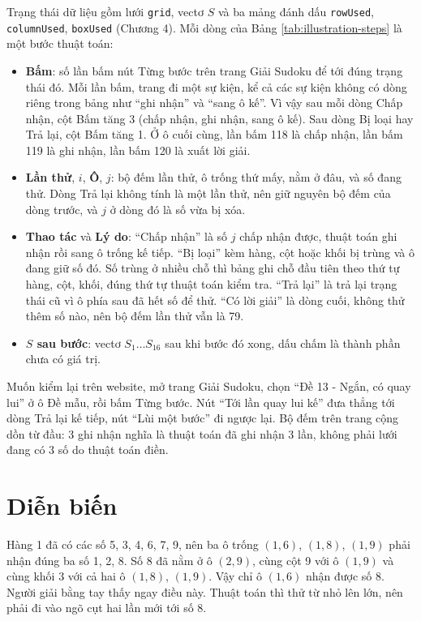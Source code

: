 Trạng thái dữ liệu gồm lưới \texttt{grid}, vectơ \(S\) và ba mảng đánh dấu \texttt{rowUsed}, \texttt{columnUsed}, \texttt{boxUsed} (Chương 4). Mỗi dòng của Bảng \ref{tab:illustration-steps} là một bước thuật toán:

\begin{itemize}
  \item \textbf{Bấm}: số lần bấm nút Từng bước trên trang Giải Sudoku để tới đúng trạng thái đó. Mỗi lần bấm, trang đi một sự kiện, kể cả các sự kiện không có dòng riêng trong bảng như ``ghi nhận'' và ``sang ô kế''. Vì vậy sau mỗi dòng Chấp nhận, cột Bấm tăng 3 (chấp nhận, ghi nhận, sang ô kế). Sau dòng Bị loại hay Trả lại, cột Bấm tăng 1. Ở ô cuối cùng, lần bấm 118 là chấp nhận, lần bấm 119 là ghi nhận, lần bấm 120 là xuất lời giải.
  \item \textbf{Lần thử}, \(i\), \textbf{Ô}, \(j\): bộ đếm lần thử, ô trống thứ mấy, nằm ở đâu, và số đang thử. Dòng Trả lại không tính là một lần thử, nên giữ nguyên bộ đếm của dòng trước, và \(j\) ở dòng đó là số vừa bị xóa.
  \item \textbf{Thao tác} và \textbf{Lý do}: ``Chấp nhận'' là số \(j\) chấp nhận được, thuật toán ghi nhận rồi sang ô trống kế tiếp. ``Bị loại'' kèm hàng, cột hoặc khối bị trùng và ô đang giữ số đó. Số trùng ở nhiều chỗ thì bảng ghi chỗ đầu tiên theo thứ tự hàng, cột, khối, đúng thứ tự thuật toán kiểm tra. ``Trả lại'' là trả lại trạng thái cũ vì ô phía sau đã hết số để thử. ``Có lời giải'' là dòng cuối, không thử thêm số nào, nên bộ đếm lần thử vẫn là 79.
  \item \textbf{\(S\) sau bước}: vectơ \(S_1 \ldots S_{16}\) sau khi bước đó xong, dấu chấm là thành phần chưa có giá trị.
\end{itemize}

Muốn kiểm lại trên website, mở trang Giải Sudoku, chọn ``Đề 13 - Ngắn, có quay lui'' ở ô Đề mẫu, rồi bấm Từng bước. Nút ``Tới lần quay lui kế'' đưa thẳng tới dòng Trả lại kế tiếp, nút ``Lùi một bước'' đi ngược lại. Bộ đếm trên trang cộng dồn từ đầu: 3 ghi nhận nghĩa là thuật toán đã ghi nhận 3 lần, không phải lưới đang có 3 số do thuật toán điền.

\section{Diễn biến}

Hàng 1 đã có các số 5, 3, 4, 6, 7, 9, nên ba ô trống \((1, 6)\), \((1, 8)\), \((1, 9)\) phải nhận đúng ba số 1, 2, 8. Số 8 đã nằm ở ô \((2, 9)\), cùng cột 9 với ô \((1, 9)\) và cùng khối 3 với cả hai ô \((1, 8)\), \((1, 9)\). Vậy chỉ ô \((1, 6)\) nhận được số 8. Người giải bằng tay thấy ngay điều này. Thuật toán thì thử từ nhỏ lên lớn, nên phải đi vào ngõ cụt hai lần mới tới số 8.

